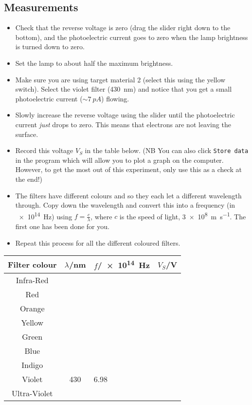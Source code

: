 \subsection{Measurements}
\begin{itemize}
\item Check that the reverse voltage is zero (drag the slider right down to the bottom), and the photoelectric current goes to zero when the lamp brightness is turned down to zero.
\item Set the lamp to about half the maximum brightness.
\item Make sure you are using target material 2 (select this using the yellow switch).  Select the violet filter (\SI{430}{nm}) and notice that you get a small photoelectric current ($\sim\SI{7}{pA}$) flowing.
\item Slowly increase the reverse voltage using the slider until the photoelectric current \emph{just} drops to zero.  This means that electrons are not leaving the surface.
\item Record this voltage $V_{S}$ in the table below. (NB You can also click \texttt{Store data} in the program which will allow you to plot a graph on the computer.  However, to get the most out of this experiment, only use this as a check at the end!)
\item The filters have different colours and so they each let a different wavelength through.  Copy down the wavelength and convert this into a frequency (in \SI{e14}{Hz}) using $f=\frac{c}{\lambda}$, where $c$ is the speed of light, \SI{3e8}{m.s^{-1}}.  The first one has been done for you.
\item Repeat this process for all the different coloured filters.
\end{itemize}

\begin{center}
\begin{tabular}{|c|c|p{2cm}|p{2cm}|}
\hline
Filter colour & $\lambda$/nm & \multicolumn{1}{|c|}{$f$/\SI{e14}{Hz}} & \multicolumn{1}{|c|}{$V_{S}$/V}\\
\hline
Infra-Red & & &\\
\hline
Red & & & \\
\hline
Orange & & & \\
\hline
Yellow & & & \\
\hline
Green & & & \\
\hline
Blue & & & \\
\hline
Indigo & & & \\
\hline
Violet & 430 & 6.98 & \\
\hline
Ultra-Violet & & & \\
\hline
\end{tabular}
\end{center}


